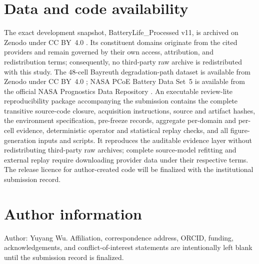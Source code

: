 \documentclass[11pt]{article}
\begin{document}
\section*{Data and code availability}

The exact development snapshot, BatteryLife\_Processed v11, is archived on Zenodo under CC BY~4.0 \citep{batterylife2026processed}. Its constituent domains originate from the cited providers and remain governed by their own access, attribution, and redistribution terms; consequently, no third-party raw archive is redistributed with this study. The $48$-cell Bayreuth degradation-path dataset is available from Zenodo under CC BY~4.0 \citep{roder2025degradationdata}; NASA PCoE Battery Data Set~5 is available from the official NASA Prognostics Data Repository \citep{saha2007nasa}. An executable review-lite reproducibility package accompanying the submission contains the complete transitive source-code closure, acquisition instructions, source and artifact hashes, the environment specification, pre-freeze records, aggregate per-domain and per-cell evidence, deterministic operator and statistical replay checks, and all figure-generation inputs and scripts. It reproduces the auditable evidence layer without redistributing third-party raw archives; complete source-model refitting and external replay require downloading provider data under their respective terms. The release licence for author-created code will be finalized with the institutional submission record.

\section*{Author information}

Author: Yuyang Wu. Affiliation, correspondence address, ORCID, funding, acknowledgements, and conflict-of-interest statements are intentionally left blank until the submission record is finalized.



\end{document}
